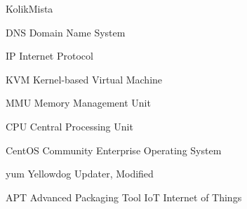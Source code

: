 \begin{seznamzkratek}{KolikMista}

		{DNS}
		{Domain Name System}
		
		{IP}
		{Internet Protocol}
		
		{KVM}
		{Kernel-based Virtual Machine}
		
		{MMU}
		{Memory Management Unit}
		
		{CPU}
		{Central Processing Unit}
		
		{CentOS}
		{Community Enterprise Operating System}


		{yum}
		{Yellowdog Updater, Modified}


		{APT}
		{Advanced Packaging Tool}
		{IoT}
		{Internet of Things}


\end{seznamzkratek}
